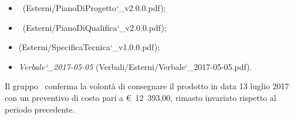 \documentclass[a4paper,12pt]{article}
\begin{document}
\begin{titlepage}
\begin{itemize}
			\item \pianodiprogettoRP\ (Esterni/PianoDiProgetto\char`_v2.0.0.pdf);
			\item \pianodiqualificaRP\ (Esterni/PianoDiQualifica\char`_v2.0.0.pdf);
			\item \specificatecnicaRP (Esterni/SpecificaTecnica\char`_v1.0.0.pdf);			
			\item \textit{Verbale\char`_2017-05-05} (Verbali/Esterni/Verbale\char`_2017-05-05.pdf).
		\end{itemize}	
		Il gruppo \kaleidoscode\ conferma la volontà di consegnare il prodotto in data 13 luglio 2017
		 con un preventivo di costo pari a \hbox{\euro\ 12 393,00},
		  rimasto invariato rispetto al periodo precedente.\\ 
		

\end{titlepage}
\end{document}
